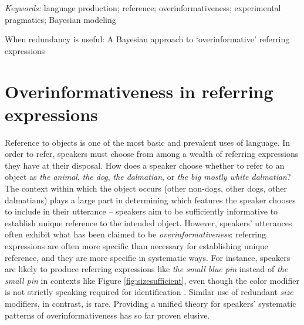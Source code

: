 \documentclass[11pt]{article}
\newcommand{\jd}[1]{\textcolor{Red}{[jd: #1]}}
\newcommand{\ndg}[1]{\textcolor{Green}{[ndg: #1]}}
\newcommand{\figref}[1]{Figure \ref{#1}}
\begin{document}
\emph{Keywords:} language production; reference; overinformativeness; experimental pragmatics; Bayesian modeling


\pagebreak




When redundancy is useful: A Bayesian approach to `overinformative' referring expressions


\section[]{Overinformativeness in referring expressions}
\label{sec:intro}

Reference to objects is one of the most basic and prevalent uses of language. In order to refer, speakers must choose from among a wealth of referring expressions they have at their disposal. How does a speaker choose whether to refer to an object as \emph{the animal}, \emph{the dog}, \emph{the dalmatian}, or \emph{the big mostly white dalmatian}? The context within which the object occurs (other non-dogs, other dogs, other dalmatians) plays a large part in determining which features the speaker chooses to include in their utterance -- speakers aim to be sufficiently informative to establish unique reference to the intended object. However, speakers' utterances often exhibit what has been claimed to be \emph{overinformativeness}: referring expressions are often more specific than necessary for establishing unique reference, and they are more specific in systematic ways. For instance, speakers are likely to produce referring expressions like \emph{the small blue pin} instead of  \emph{the small pin} in contexts like \figref{fig:sizesufficient}, even though the color modifier is not strictly speaking required for identification \cite{gatt2011, Gatt2014, Arts2011, Koolen2011}. Similar use of redundant \emph{size} modifiers, in contrast, is rare. 
Providing a unified theory for speakers' systematic patterns of overinformativeness has so far proven elusive.
\end{document}
